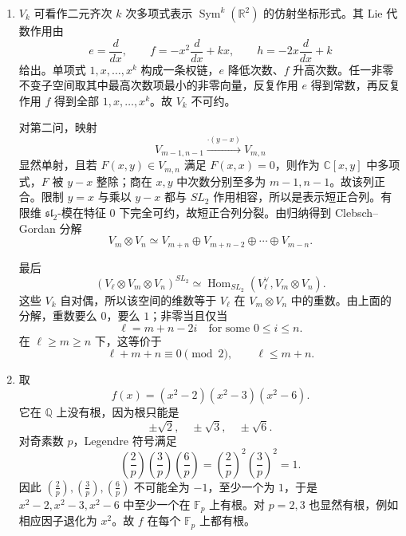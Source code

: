 \documentclass[UTF8,12pt]{ctexart}
\begin{document}
\begin{enumerate}[label=\textbf{\arabic*.},leftmargin=2.2em]
多项式 \(P_t\) 的首项系数为 \(1\)。给定无序二元集
\[
A=\{t_4,t_5\}
\]
及 \(t_0\)，多项式可写为
\[
P_{A,t_0}(x)=\prod_{a\in\mathbb F_5\setminus A}(x-a)+t_0\prod_{a\in A}(x-a).
\]
所以 \(A,t_0\) 相同必给出相同多项式。反过来，若两个参数给出同一多项式，则由构造得到一个从
\[
\{A\subset\mathbb F_5:|A|=2\}\times\mathbb F_5^\times
\]
到首一不可约三次多项式集合的映射。定义域大小为
\[
\binom52\cdot4=40.
\]
而 \(\mathbb F_5\) 上首一不可约三次多项式个数为
\[
\frac{5^3-5}{3}=40.
\]
第一问说明该映射落入不可约三次多项式集合。只要出现两个不同参数给同一多项式，像的大小就小于 \(40\)，不可能覆盖所有不可约三次；但每个不可约三次的三个根在 \(\mathbb F_{125}\) 中形成 Frobenius 轨道，按其在 \(\mathbb F_5\) 上的取值插值可反构出唯一的 \(A,t_0\)。故映射为双射，第二、三问同时成立。

\item \(V_k\) 可看作二元齐次 \(k\) 次多项式表示 \(\operatorname{Sym}^k(\mathbb R^2)\) 的仿射坐标形式。其 Lie 代数作用由
\[
e=\frac{d}{dx},\qquad
f=-x^2\frac{d}{dx}+kx,\qquad
h=-2x\frac{d}{dx}+k
\]
给出。单项式 \(1,x,\ldots,x^k\) 构成一条权链，\(e\) 降低次数、\(f\) 升高次数。任一非零不变子空间取其中最高次数项最小的非零向量，反复作用 \(e\) 得到常数，再反复作用 \(f\) 得到全部 \(1,x,\ldots,x^k\)。故 \(V_k\) 不可约。

对第二问，映射
\[
V_{m-1,n-1}\xrightarrow{\cdot(y-x)}V_{m,n}
\]
显然单射，且若 \(F(x,y)\in V_{m,n}\) 满足 \(F(x,x)=0\)，则作为 \(\mathbb C[x,y]\) 中多项式，\(F\) 被 \(y-x\) 整除；商在 \(x,y\) 中次数分别至多为 \(m-1,n-1\)。故该列正合。限制 \(y=x\) 与乘以 \(y-x\) 都与 \(SL_2\) 作用相容，所以是表示短正合列。有限维 \(\mathfrak{sl}_2\)-模在特征 \(0\) 下完全可约，故短正合列分裂。由归纳得到 Clebsch--Gordan 分解
\[
V_m\otimes V_n\simeq V_{m+n}\oplus V_{m+n-2}\oplus\cdots\oplus V_{m-n}.
\]

最后
\[
(V_\ell\otimes V_m\otimes V_n)^{SL_2}
\simeq \operatorname{Hom}_{SL_2}(V_\ell^\vee,V_m\otimes V_n).
\]
这些 \(V_k\) 自对偶，所以该空间的维数等于 \(V_\ell\) 在 \(V_m\otimes V_n\) 中的重数。由上面的分解，重数要么 \(0\)，要么 \(1\)；非零当且仅当
\[
\ell=m+n-2i\quad\text{for some }0\le i\le n.
\]
在 \(\ell\ge m\ge n\) 下，这等价于
\[
\ell+m+n\equiv0\pmod2,\qquad \ell\le m+n.
\]

\item 取
\[
f(x)=(x^2-2)(x^2-3)(x^2-6).
\]
它在 \(\mathbb Q\) 上没有根，因为根只能是
\[
\pm\sqrt2,\quad \pm\sqrt3,\quad \pm\sqrt6.
\]
对奇素数 \(p\)，Legendre 符号满足
\[
\left(\frac2p\right)\left(\frac3p\right)\left(\frac6p\right)
=\left(\frac2p\right)^2\left(\frac3p\right)^2=1.
\]
因此 \(\left(\frac2p\right),\left(\frac3p\right),\left(\frac6p\right)\) 不可能全为 \(-1\)，至少一个为 \(1\)，于是 \(x^2-2,x^2-3,x^2-6\) 中至少一个在 \(\mathbb F_p\) 上有根。对 \(p=2,3\) 也显然有根，例如相应因子退化为 \(x^2\)。故 \(f\) 在每个 \(\mathbb F_p\) 上都有根。


\end{enumerate}
\end{document}
